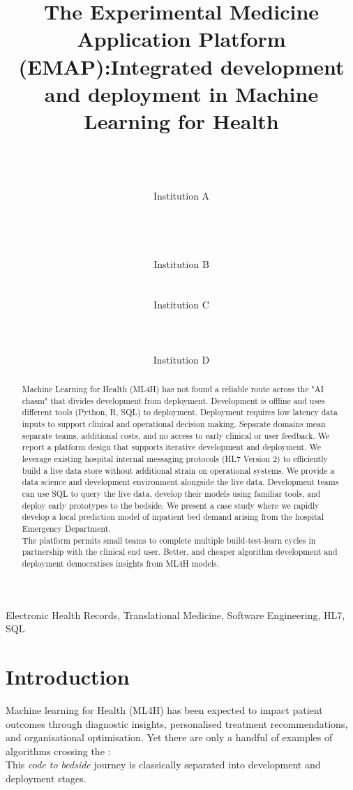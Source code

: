 \documentclass[pmlr,twocolumn,10pt]{jmlr} %
\title[Integrating development and deployment in ML4H]{The Experimental Medicine Application Platform (EMAP):\titlebreak Integrated development and deployment in Machine Learning for Health}
\author{%
\Name{Author X}\equal{These authors contributed equally} \Email{X@A}\\
\Name{Author X}\footnotemark[1] \Email{X@A}\\
\Name{Author X} \Email{X@Y}\\
\addr Institution A
\AND
\Name{Author X} \Email{X@B}\\
\Name{Author X} \Email{X@B}\\
\Name{Author X} \Email{X@B}\\
\Name{Author X} \Email{X@B}\\
\Name{Author X} \Email{X@B}\\
\addr Institution B
\AND
\Name{Author X} \Email{X@C}\\
\Name{Author X} \Email{X@C}\\
\Name{Author X} \Email{X@C}\\
\addr Institution C
\AND
\Name{Author X} \Email{X@D}\\
\Name{Author X} \Email{X@D}\\
\Name{Author X} \Email{X@D}\\
\Name{Author X} \Email{X@D}\\
\addr Institution D
}
\begin{document}
\maketitle

\begin{abstract}
Machine Learning for Health (ML4H) has not found a reliable route across the "AI chasm" that divides development from deployment. Development is offline and uses different tools (Python, R, SQL) to deployment. Deployment requires low latency data inputs to support clinical and operational decision making. Separate domains mean separate teams, additional costs, and no access to early clinical or user feedback. 
We report a platform design that supports iterative development and deployment. We leverage existing hospital internal messaging protocols (HL7 Version 2) to efficiently build a live data store without additional strain on operational systems. We provide a data science and development environment alongside the live data. Development teams can use SQL to query the live data, develop their models using familiar tools, and deploy early prototypes to the bedside. We present a case study where we rapidly develop a local prediction model of inpatient bed demand arising from the hospital Emergency Department.\\
The platform permits small teams to complete multiple build-test-learn cycles in partnership with the clinical end user. Better, and cheaper algorithm development and deployment democratises insights from ML4H models.
\end{abstract}

\begin{keywords}
Electronic Health Records, Translational Medicine, Software Engineering, HL7, SQL
\end{keywords}

\section{Introduction}
\label{sec:intro}

Machine learning for Health (ML4H) has been expected to impact patient outcomes through diagnostic insights, personalised treatment recommendations, and organisational optimisation.\citep{yu2018, topol2019a} Yet there are only a handful of examples of algorithms crossing the : \citep{keane2018a}\\
This \textit{code to bedside} journey is classically separated into development and deployment stages.
\end{document}
